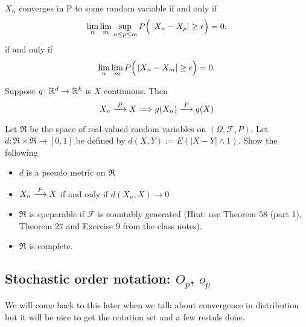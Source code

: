 \begin{theorem}
\label{cauchy for P}
$X_n$ converges in P to some random variable if and only if
\begin{equation}
\lim_{n}\lim_{m}  \sup_{n\leq p\leq m} P\Bigl(\, |X_n-X_p| \geq \epsilon \Bigr)=0.
\end{equation}
if and only if
\begin{equation}
\lim_{n}\lim_{m}   P\Bigl(\, |X_n-X_m| \geq \epsilon \Bigr)=0.
\end{equation}
\end{theorem}




\begin{theorem}
\label{continuous mapping  P}
Suppose $g\colon\Bbb R^d\rightarrow\Bbb R^k$ is $X$-continuous. Then
\[X_n \overset{\small P} \longrightarrow X \Longrightarrow g(X_n) \overset{\small P} \longrightarrow g(X) \]
\end{theorem}



\begin{exercise}
Let $\mathfrak R$ be the space of real-valued random variables on $(\Omega, \mathcal F, P)$. Let $d\colon  \mathfrak R \times \mathfrak R \rightarrow [0,1]$ be defined by $d(X,Y):= E(|X-Y|\wedge 1)$. Show the following
\begin{itemize}
\item $d$ is a pseudo metric on $\mathfrak R$
\item $X_n\overset{\small P} \longrightarrow X$ if and only if $d(X_n, X)\rightarrow 0$
\item $\mathfrak R$ is speparable if $\mathcal F$ is countably generated (Hint: use Theorem 58 (part 1), Theorem 27 and Exercise 9 from the class notes).
\item $\mathfrak R$ is complete.
\end{itemize}
\end{exercise}




%
%
\subsection{Stochastic order notation: $O_p$, $o_p$}
We will come back to this later when we talk about convergence in distribution but it will be nice to get the notation set and a few restuls done.


